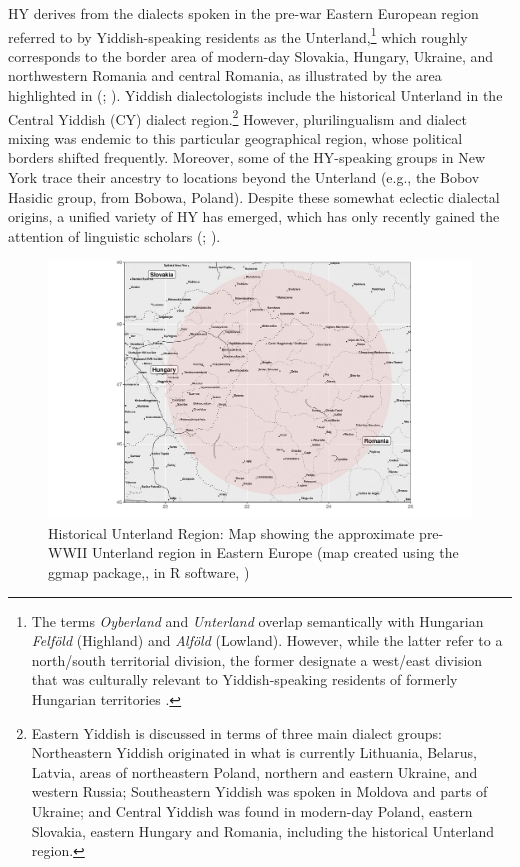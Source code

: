 \documentclass[output=paper]{langsci/langscibook}
\begin{document}
HY derives from the dialects spoken in the pre-war Eastern European region referred to by Yiddish-speaking residents as the Unterland,\footnote{The terms \textit{Oyberland} and \textit{Unterland} overlap semantically with Hungarian \textit{Felföld} (Highland) and \textit{Alföld} (Lowland). However, while the latter refer to a north/south territorial division, the former designate a west/east division that was culturally relevant to Yiddish-speaking residents of formerly Hungarian territories \citep{Weinreich1964}.} which roughly corresponds to the border area of modern-day Slovakia, Hungary, Ukraine, and northwestern Romania and central Romania, as illustrated by the area highlighted in  (\citealt{Weinreich1964}; \citealt{Krogh2012}). Yiddish dialectologists include the historical Unterland in the Central Yiddish (CY) dialect region.\footnote{Eastern Yiddish is discussed in terms of three main dialect groups: Northeastern Yiddish originated in what is currently Lithuania, Belarus, Latvia, areas of northeastern Poland, northern and eastern Ukraine, and western Russia; Southeastern Yiddish was spoken in Moldova and parts of Ukraine; and Central Yiddish was found in modern-day Poland, eastern Slovakia, eastern Hungary and Romania, including the historical Unterland region.} However, plurilingualism and dialect mixing was endemic to this particular geographical region, whose political borders shifted frequently. Moreover, some of the HY-speaking groups in New York trace their ancestry to locations beyond the Unterland (e.g., the Bobov Hasidic group, from Bobowa, Poland). Despite these somewhat eclectic dialectal origins, a unified variety of HY has emerged, which has only recently gained the attention of linguistic scholars (\citealt{Nove2018a}; \citealt{SadockMasor2018}). 

 
\begin{figure}
\includegraphics[width=\textwidth]{figures/nove-fig2-gray.pdf}
\caption{ Historical Unterland Region: Map showing the approximate pre-WWII Unterland region in Eastern Europe (map created using the ggmap package,\citealt{KahleWickham2013}, in R software, \citealt{RCore2017})}\label{fig:nove:2}
\end{figure}
\end{document}
